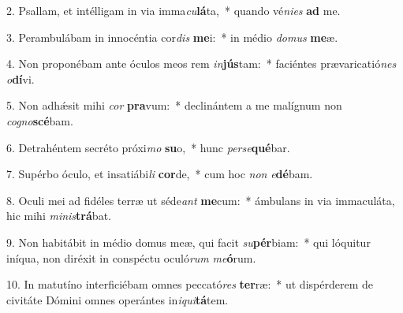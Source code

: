 2. Psallam, et intélligam in via imma\textit{cu}\textbf{lá}ta,~*  quando vé\textit{ni}\textit{es} \textbf{ad} me.\

3. Perambulábam in innocéntia cor\textit{dis} \textbf{me}i:~*  in médio \textit{do}\textit{mus} \textbf{me}æ.\

4. Non proponébam ante óculos meos rem \textit{in}\textbf{jús}tam:~*  faciéntes prævaricatió\textit{nes} \textit{o}\textbf{dí}vi.\

5. Non adhǽsit mihi \textit{cor} \textbf{pra}vum:~*  declinántem a me malígnum non \textit{co}\textit{gno}\textbf{scé}bam.\

6. Detrahéntem secréto próxi\textit{mo} \textbf{su}o,~*  hunc \textit{per}\textit{se}\textbf{qué}bar.\

7. Supérbo óculo, et insatiábi\textit{li} \textbf{cor}de,~*  cum hoc \textit{non} \textit{e}\textbf{dé}bam.\

8. Oculi mei ad fidéles terræ ut séde\textit{ant} \textbf{me}cum:~*  ámbulans in via immaculáta, hic mihi \textit{mi}\textit{nis}\textbf{trá}bat.\

9. Non habitábit in médio domus meæ, qui facit \textit{su}\textbf{pér}biam:~*  qui lóquitur iníqua, non diréxit in conspéctu oculó\textit{rum} \textit{me}\textbf{ó}rum.\

10. In matutíno interficiébam omnes peccató\textit{res} \textbf{ter}ræ:~*  ut dispérderem de civitáte Dómini omnes operántes in\textit{i}\textit{qui}\textbf{tá}tem.\


